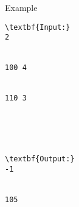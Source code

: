 Example
\begin{verbatim}
\textbf{Input:}
2


100 4


110 3





\textbf{Output:}
-1


105 \end{verbatim}